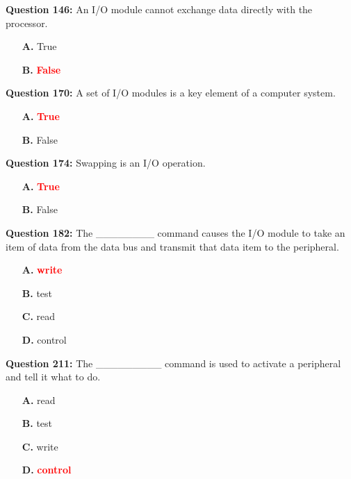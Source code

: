 \documentclass[12pt,a4paper]{article}
\begin{document}
\textbf{Question 146:} An I/O module cannot exchange data directly with the processor.

\begin{itemize}
    \item[\textbf{A.}] True
    \item[\textbf{B.}] \textcolor{red}{\textbf{False}}
\end{itemize}

\vspace{0.5cm}

\textbf{Question 170:} A set of I/O modules is a key element of a computer system.

\begin{itemize}
    \item[\textbf{A.}] \textcolor{red}{\textbf{True}}
    \item[\textbf{B.}] False
\end{itemize}

\vspace{0.5cm}

\textbf{Question 174:} Swapping is an I/O operation.

\begin{itemize}
    \item[\textbf{A.}] \textcolor{red}{\textbf{True}}
    \item[\textbf{B.}] False
\end{itemize}

\vspace{0.5cm}

\textbf{Question 182:} The ________ command causes the I/O module to take an item of data from the data bus and transmit that data item to the peripheral.

\begin{itemize}
    \item[\textbf{A.}] \textcolor{red}{\textbf{write}}
    \item[\textbf{B.}] test
    \item[\textbf{C.}] read
    \item[\textbf{D.}] control
\end{itemize}

\vspace{0.5cm}

\textbf{Question 211:} The _________ command is used to activate a peripheral and tell it what to do.

\begin{itemize}
    \item[\textbf{A.}] read
    \item[\textbf{B.}] test
    \item[\textbf{C.}] write
    \item[\textbf{D.}] \textcolor{red}{\textbf{control}}
\end{itemize}
\end{document}
